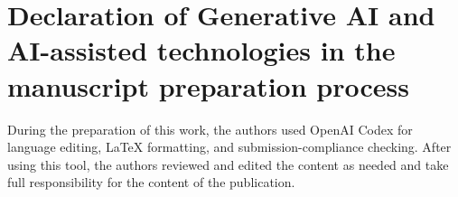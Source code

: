 \documentclass[final,5p,times,number]{elsarticle}
\begin{document}
\section*{Declaration of Generative AI and AI-assisted technologies in the manuscript preparation process}
During the preparation of this work, the authors used OpenAI Codex for language editing, LaTeX formatting, and submission-compliance checking. After using this tool, the authors reviewed and edited the content as needed and take full responsibility for the content of the publication.

\setlength{\bibsep}{0pt}


\end{document}
